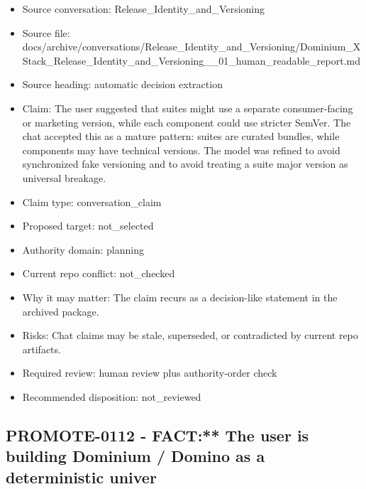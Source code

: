 \documentclass[11pt,a4paper]{report}
\begin{document}
\begin{itemize}
\item Source conversation: Release\_Identity\_and\_Versioning
\item Source file: docs/archive/conversations/Release\_Identity\_and\_Versioning/Dominium\_XStack\_Release\_Identity\_and\_Versioning\_\_01\_human\_readable\_report.md
\item Source heading: automatic decision extraction
\item Claim: The user suggested that suites might use a separate consumer-facing or marketing version, while each component could use stricter SemVer. The chat accepted this as a mature pattern: suites are curated bundles, while components may have technical versions. The model was refined to avoid synchronized fake versioning and to avoid treating a suite major version as universal breakage.
\item Claim type: conversation\_claim
\item Proposed target: not\_selected
\item Authority domain: planning
\item Current repo conflict: not\_checked
\item Why it may matter: The claim recurs as a decision-like statement in the archived package.
\item Risks: Chat claims may be stale, superseded, or contradicted by current repo artifacts.
\item Required review: human review plus authority-order check
\item Recommended disposition: not\_reviewed
\end{itemize}

\subsection{PROMOTE-0112 - FACT:** The user is building Dominium / Domino as a deterministic univer}
\end{document}

